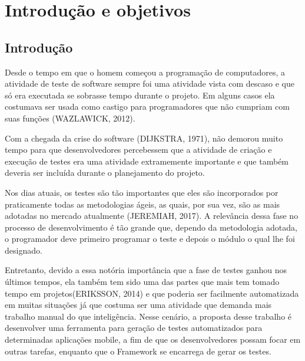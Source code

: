 \documentclass[
    12pt,       %
    openright,      %
    twoside,      %
    a4paper,      %
    english,      %
    french,       %
    spanish,      %
    brazil,       %
    ]{abntex2}
\begin{document}
  \tableofcontents*
  \cleardoublepage



  \textual


  \chapter{Introdução e objetivos}
  \section{Introdução}
      Desde o tempo em que o homem começou a programação de computadores, a atividade
  de teste de software sempre foi uma atividade vista com descaso e que só era
  executada se sobrasse tempo durante o projeto. Em alguns casos ela costumava ser
  usada como castigo para programadores que não cumpriam com suas funções
  (WAZLAWICK, 2012).

  Com a chegada da crise do software (DIJKSTRA, 1971), não demorou muito tempo
  para que desenvolvedores percebessem que a atividade de criação e execução de
  testes era uma atividade extramemente importante e que também deveria ser
  incluída durante o planejamento do projeto.

  Nos dias atuais, os testes são tão importantes que eles são incorporados
  por praticamente todas as metodologias ágeis, as quais, por sua vez,
  são as mais adotadas no mercado atualmente (JEREMIAH, 2017). A relevância dessa fase
  no processo de desenvolvimento é tão grande que, dependo da metodologia
  adotada, o programador deve primeiro programar o teste e depois o módulo
  o qual lhe foi designado.

  Entretanto, devido a essa notória importância que a fase de testes ganhou nos
  últimos tempos, ela também tem sido uma das partes que mais tem tomado tempo
  em projetos(ERIKSSON, 2014) e que poderia ser facilmente automatizada em muitas situações já que
  costuma ser uma atividade que demanda mais trabalho manual do que inteligência.
  Nesse cenário, a proposta desse trabalho é desenvolver uma ferramenta para
  geração de testes automatizados para determinadas aplicações mobile, a fim de
  que os desenvolvedores possam focar em outras tarefas, enquanto
  que o Framework se encarrega de gerar os testes.
\end{document}
